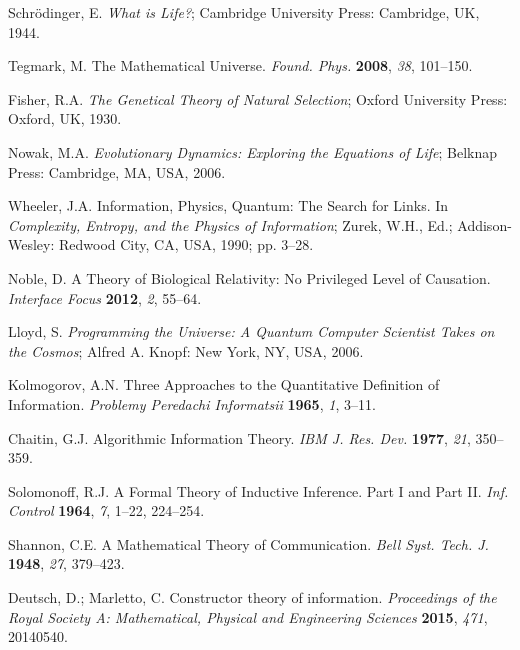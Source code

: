 \documentclass[preprint,12pt]{elsarticle}
\begin{document}
\begin{thebibliography}{999}

Schrödinger, E. \textit{What is Life?}; Cambridge University Press: Cambridge, UK, 1944.

Tegmark, M. The Mathematical Universe. \textit{Found. Phys.} \textbf{2008}, \textit{38}, 101–150. 

Fisher, R.A. \textit{The Genetical Theory of Natural Selection}; Oxford University Press: Oxford, UK, 1930.

Nowak, M.A. \textit{Evolutionary Dynamics: Exploring the Equations of Life}; Belknap Press: Cambridge, MA, USA, 2006.

Wheeler, J.A. Information, Physics, Quantum: The Search for Links. In \textit{Complexity, Entropy, and the Physics of Information}; Zurek, W.H., Ed.; Addison-Wesley: Redwood City, CA, USA, 1990; pp. 3–28.

Noble, D. A Theory of Biological Relativity: No Privileged Level of Causation. \textit{Interface Focus} \textbf{2012}, \textit{2}, 55–64.

Lloyd, S. \textit{Programming the Universe: A Quantum Computer Scientist Takes on the Cosmos}; Alfred A. Knopf: New York, NY, USA, 2006.

Kolmogorov, A.N. Three Approaches to the Quantitative Definition of Information. \textit{Problemy Peredachi Informatsii} \textbf{1965}, \textit{1}, 3–11.

Chaitin, G.J. Algorithmic Information Theory. \textit{IBM J. Res. Dev.} \textbf{1977}, \textit{21}, 350–359. 

Solomonoff, R.J. A Formal Theory of Inductive Inference. Part I and Part II. \textit{Inf. Control} \textbf{1964}, \textit{7}, 1–22, 224–254.

Shannon, C.E. A Mathematical Theory of Communication. \textit{Bell Syst. Tech. J.} \textbf{1948}, \textit{27}, 379–423.

Deutsch, D.; Marletto, C. Constructor theory of information. \textit{Proceedings of the Royal Society A: Mathematical, Physical and Engineering Sciences} \textbf{2015}, \textit{471}, 20140540. 


\end{thebibliography}
\end{document}
